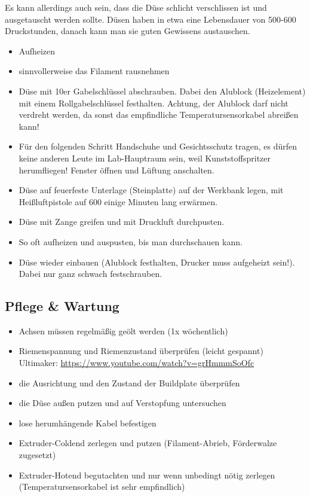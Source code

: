 \documentclass{\basedir/fablab-document}
\begin{document}
Es kann allerdings auch sein, dass die Düse schlicht verschlissen ist und ausgetauscht werden sollte. Düsen haben in etwa eine Lebensdauer von 500-600 Druckstunden, danach kann man sie guten Gewissens austauschen.

\begin{itemize}
 \item Aufheizen
 \item sinnvollerweise das Filament rausnehmen
 \item Düse mit 10er Gabelschlüssel abschrauben. Dabei den Alublock (Heizelement) mit einem Rollgabelschlüssel festhalten. Achtung, der Alublock darf nicht verdreht werden, da sonst das empfindliche Temperatursensorkabel abreißen kann!
 \item Für den folgenden Schritt Handschuhe und Gesichtsschutz tragen, es dürfen keine anderen Leute im Lab-Hauptraum sein, weil Kunststoffspritzer herumfliegen! Fenster öffnen und Lüftung anschalten.
 \item Düse auf feuerfeste Unterlage (Steinplatte) auf der Werkbank legen, mit Heißluftpistole auf 600\textcelsius{} einige Minuten lang erwärmen.
 \item Düse mit Zange greifen und mit Druckluft durchpusten.
 \item So oft aufheizen und auspusten, bis man durchschauen kann.
 \item Düse wieder einbauen (Alublock festhalten, Drucker muss aufgeheizt sein!). Dabei nur ganz schwach festschrauben.
\end{itemize}


\subsection{Pflege \& Wartung}

\begin{itemize}
\item Achsen müssen regelmäßig geölt werden (1x wöchentlich)
\item Riemenspannung und Riemenzustand überprüfen (leicht gespannt)\\
Ultimaker: \url{https://www.youtube.com/watch?v=grHmmmSoOfc}
\item die Ausrichtung und den Zustand der Buildplate überprüfen
\item die Düse außen putzen und auf Verstopfung untersuchen
\item lose herumhängende Kabel befestigen
\item Extruder-Coldend zerlegen und putzen (Filament-Abrieb, Förderwalze zugesetzt)
\item Extruder-Hotend begutachten und nur wenn unbedingt nötig zerlegen (Temperatursensorkabel ist sehr empfindlich)
\end{itemize}
\end{document}
